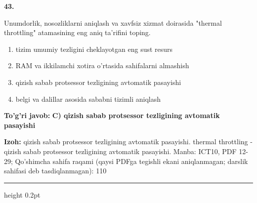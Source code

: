 \documentclass[10pt,a4paper]{article}
\begin{document}
{\bfseries\sffamily\color{ink} 43.}
\par
Unumdorlik, nosozliklarni aniqlash va xavfsiz xizmat doirasida "thermal throttling" atamasining eng aniq ta'rifini toping.
\begin{enumerate}[label=\Alph*),leftmargin=9mm]
\item tizim umumiy tezligini cheklayotgan eng sust resurs
\item RAM va ikkilamchi xotira o'rtasida sahifalarni almashish
\item qizish sabab protsessor tezligining avtomatik pasayishi
\item belgi va dalillar asosida sababni tizimli aniqlash
\end{enumerate}
\begin{tcolorbox}[enhanced,breakable,colback=teal!4,colframe=teal!60!black,boxrule=0.45pt,arc=1.2mm,left=2.7mm,right=2.7mm,top=1.8mm,bottom=1.8mm,before skip=2mm,after skip=2mm]
{\bfseries\sffamily\color{teal}To'g'ri javob:} \textbf{C) qizish sabab protsessor tezligining avtomatik pasayishi}
\par\smallskip
{\bfseries Izoh:} qizish sabab protsessor tezligining avtomatik pasayishi. thermal throttling - qizish sabab protsessor tezligining avtomatik pasayishi. Manba: ICT10, PDF 12-29; Qo'shimcha sahifa raqami (qaysi PDFga tegishli ekani aniqlanmagan; darslik sahifasi deb tasdiqlanmagan): 110
\end{tcolorbox}
\vspace{2mm}\hrule height 0.2pt\vspace{3mm}
\end{document}
